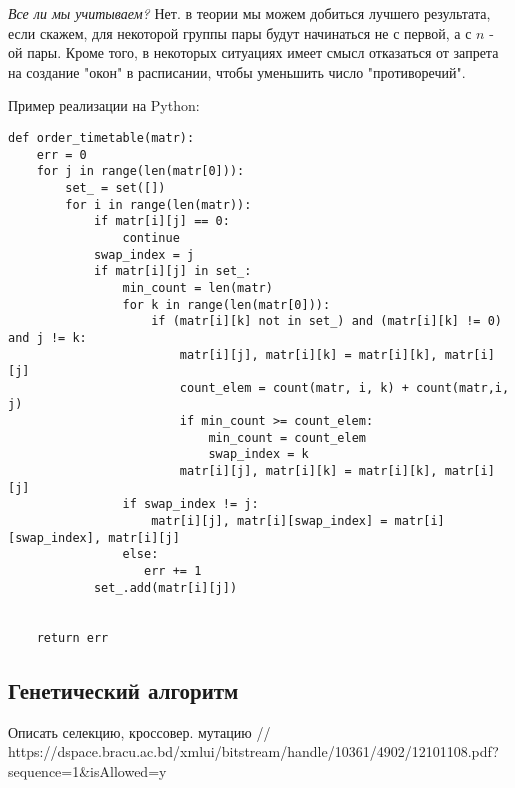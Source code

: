 \documentclass{article}
\begin{document}
\par
\textit{Все ли мы учитываем?} Нет. в теории мы можем добиться лучшего результата, если скажем, для некоторой группы пары будут начинаться не с первой, а с  \(n\) - ой пары. Кроме того, в некоторых ситуациях имеет смысл отказаться от запрета на создание "окон" в расписании, чтобы уменьшить число "противоречий". 
\par
Пример реализации на Python:
\begin{lstlisting}
def order_timetable(matr):
    err = 0
    for j in range(len(matr[0])):
        set_ = set([])
        for i in range(len(matr)):
            if matr[i][j] == 0:
                continue
            swap_index = j
            if matr[i][j] in set_:
                min_count = len(matr)
                for k in range(len(matr[0])):
                    if (matr[i][k] not in set_) and (matr[i][k] != 0) and j != k:
                        matr[i][j], matr[i][k] = matr[i][k], matr[i][j]
                        count_elem = count(matr, i, k) + count(matr,i, j)
                        if min_count >= count_elem:
                            min_count = count_elem
                            swap_index = k
                        matr[i][j], matr[i][k] = matr[i][k], matr[i][j]
                if swap_index != j:
                    matr[i][j], matr[i][swap_index] = matr[i][swap_index], matr[i][j]
                else:
                   err += 1
            set_.add(matr[i][j])
           
            
    return err
\end{lstlisting}
\subsection{Генетический алгоритм}
Описать селекцию, кроссовер. мутацию
//
https://dspace.bracu.ac.bd/xmlui/bitstream/handle/10361/4902/12101108.pdf?sequence=1&isAllowed=y
\end{document}
